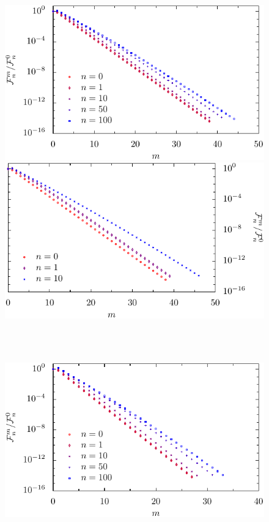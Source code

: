 \begin{figure}
  \begin{minipage}[b]{.5\linewidth}
  \centering
  \includegraphics[scale=0.77]{plots/numeric/summ/RbyL0_1_T0_5.pdf}
  \end{minipage}%
  \begin{minipage}[b]{.5\linewidth}
  \centering
  \includegraphics[scale=0.77]{plots/numeric/summ/RbyL0_1_T10_0.pdf}
  \end{minipage} \\
  \ \\
  \begin{minipage}[b]{.5\linewidth}
  \centering
  \includegraphics[scale=0.77]{plots/numeric/summ/RbyL0_2_T0_5.pdf}

\end{minipage}
\end{figure}
